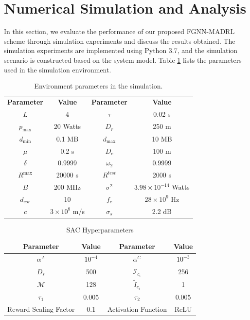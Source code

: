 \documentclass[lettersize,journal,onecolumn]{IEEEtran}
\begin{document}
\section{Numerical Simulation and Analysis}
In this section, we evaluate the performance of our proposed FGNN-MADRL scheme through simulation experiments and discuss the results obtained. The simulation experiments are implemented using Python 3.7, and the simulation scenario is constructed based on the system model. Table \ref{tab2} lists the parameters used in the simulation environment. 
\begin{table}[t]
	\caption{Environment parameters in the simulation.}
	\label{tab2}
	\footnotesize
	\centering
	\begin{tabular}{|c|c|c|c|}
		\hline
		\textbf{Parameter} &\textbf{Value} &\textbf{Parameter} &\textbf{Value}\\
		$L$ & 4 & $\tau$ & 0.02 s \\ 
		${{p}_{\max}}$ & 20 Watts & ${{D}_{r}}$ & 250 m \\ 
		${{d}_{\min}}$ & 0.1 MB & ${{d}_{\max}}$ & 10 MB \\ 
		$\mu$ & 0.2 s & ${{{D}}_{c}}$ & 100 m \\ 
		$\delta$ & 0.9999 & ${{\omega}_{{2}}}$ & 0.9999 \\ 
		${{R}^{\max}}$ & 20000 s & ${{R}^{test}}$ & 2000 s \\ 
		$B$ & 200 MHz & ${{\sigma}^{2}}$ & $3.98\times {{10}^{-14}}$ Watts \\ 
		${{d}_{{cor}}}$ & 10 & ${{f}_{c}}$ & $28\times {{10}^{9}}$ Hz \\ 
		$c$ & $3\times {{10}^{8}}$ m/s & ${{\sigma}_{s}}$ & 2.2 dB \\ 
		\hline
	\end{tabular}
\end{table}
\begin{table}
	\caption{SAC Hyperparameters}
	\label{tab3}
	\footnotesize
	\centering
	\begin{tabular}{|c|c|c|c|}
		\hline
		\textbf{Parameter} &\textbf{Value} &\textbf{Parameter} &\textbf{Value}\\
		\hline
		${{\alpha}^{A}}$ & ${{10}^{-4}}$ & ${{\alpha}^{C}}$ & ${{10}^{-3}}$ \\ 
		${{D}_{s}}$ & 500 & ${{\mathcal{I}}_{{{c}_{i}}}}$ & 256 \\ 
		$\mathcal{M}$ & 128 & ${{\tilde{I}}_{{{c}_{i}}}}$ & 1 \\ 
		${{\tau}_{1}}$ & 0.005 & ${{\tau}_{2}}$ & 0.005 \\ 
		Reward Scaling Factor & 0.1 & Activation Function & ReLU \\
		\hline
		\end{tabular}
\end{table}
\end{document}
